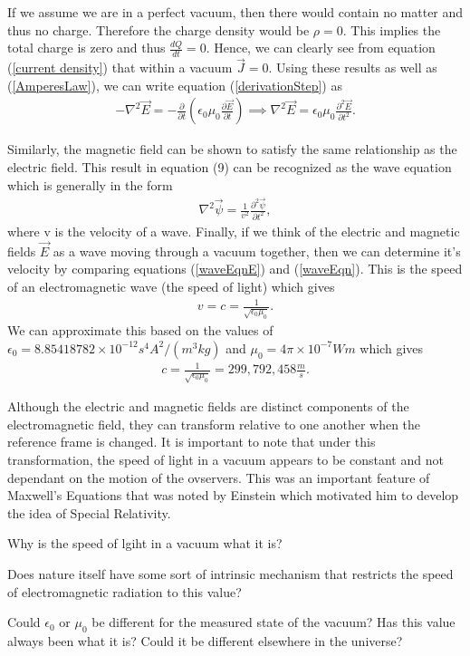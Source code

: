 If we assume we are in a perfect vacuum, then there would contain no matter and thus no charge. Therefore the charge density would be $\rho=0$. This implies the total charge is zero and thus $\frac{dQ}{dt}=0$. Hence, we can clearly see from equation (\ref{current density}) that within a vacuum $\vec{J}=0$. Using these results as well as (\ref{AmperesLaw}), we can write equation (\ref{derivationStep}) as
\begin{align}
	-\nabla^2\vec{E} = -\frac{\partial}{\partial t}\left(\epsilon_0\mu_0\frac{\partial \vec{E}}{\partial t}\right) \implies \nabla^2\vec{E} = \epsilon_0\mu_0\frac{\partial^2 \vec{E}}{\partial t^2}. \label{waveEqnE}
\end{align}

Similarly, the magnetic field can be shown to satisfy the same relationship as the electric field. This result in equation (9) can be recognized as the wave equation which is generally in the form
\begin{align}
	\nabla^2\vec{\psi} = \frac{1}{v^2}\frac{\partial^2 \vec{\psi}}{\partial t^2},\label{waveEqn}
\end{align}
where v is the velocity of a wave. Finally, if we think of the electric and magnetic fields $\vec{E}$ as a wave moving through a vacuum together, then we can determine it's velocity by comparing equations (\ref{waveEqnE}) and (\ref{waveEqn}). This is the speed of an electromagnetic wave (the speed of light) which gives
\begin{align}
	v=c=\frac{1}{\sqrt{\epsilon_0\mu_0}}.
\end{align}
We can approximate this based on the values of $\epsilon_0 = 8.85418782 \times 10^{-12}  s^4 A^2/(m^3 kg)$ and $\mu_0 =4\pi \times 10^{-7} Wm$ which gives
\begin{align}
	c=\frac{1}{\sqrt{\epsilon_0\mu_0}} = \boxed{299,792,458 \frac{m}{s}}.
\end{align}

\begin{interestnote}
Although the electric and magnetic fields are distinct components of the electromagnetic field, they can transform relative to one another when the reference frame is changed. It is important to note that under this transformation, the speed of light in a vacuum appears to be constant and not dependant on the motion of the ovservers. This was an important feature of Maxwell's Equations that was noted by Einstein which motivated him to develop the idea of Special Relativity. \label{speed of light constant in all reference frames note}
\end{interestnote}

\begin{questions}
	\item Why is the speed of lgiht in a vacuum what it is?
 	\item Does nature itself have some sort of intrinsic mechanism that restricts the speed of electromagnetic radiation to this value?
  	\item Could $\epsilon_0$ or $\mu_0$ be different for the measured state of the vacuum? Has this value always been what it is? Could it be different elsewhere in the universe?
\end{questions}
